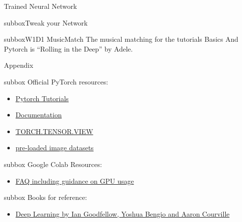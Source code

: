 \begin{multicols}{3}
\begin{textbox}{Trained Neural Network}
\begin{subbox}{subbox}{Tweak your Network}
\end{subbox}
\begin{subbox}{subbox}{W1D1 MusicMatch \musEighth}
\scriptsize
The  
 musical matching for the
 tutorials Basics And Pytorch  is
“Rolling in the Deep” by Adele. 

\end{subbox}
\end{textbox}

\begin{textbox}{Appendix}
\begin{subbox}{subbox}{ Official PyTorch resources:}
\scriptsize
\begin{itemize}
    \item 
\href{https://pytorch.org/tutorials/}{Pytorch Tutorials}

\item 
\href{https://pytorch.org/docs/stable/tensors.html}{Documentation}

\item  
\href{https://pytorch.org/docs/stable/generated/torch.Tensor.view.html#torch.Tensor.view}{TORCH.TENSOR.VIEW}

\item  
\href{https://pytorch.org/vision/stable/datasets.html}{pre-loaded image datasets}

\end{itemize} 
\end{subbox}
\begin{subbox}{subbox}{ Google Colab Resources:}
\begin{itemize}
    \item 
    \href{https://research.google.com/colaboratory/faq.html}{FAQ including guidance on GPU usage}

 \end{itemize}
\end{subbox}
\begin{subbox}{subbox}{ Books for reference:}
\begin{itemize}
    \item 
    \href{https://www.deeplearningbook.org/}{Deep Learning by Ian Goodfellow, Yoshua Bengio and Aaron Courville}

 \end{itemize}
\end{subbox}
\end{textbox}
\end{multicols}